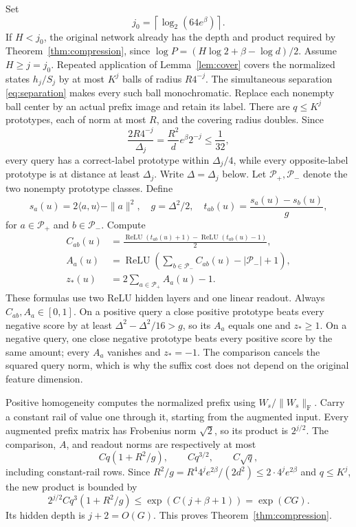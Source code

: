 \documentclass[11pt]{article}
\theoremstyle{remark}\newtheorem{remark}[theorem]{Remark}
\newcommand{\relu}{\operatorname{ReLU}}
\newcommand{\F}{\mathrm F}
\begin{document}
Set
\[
 j_0=\left\lceil\log_2(64e^\beta)\right\rceil.
\]
If $H<j_0$, the original network already has the depth and product required
by Theorem~\ref{thm:compression}, since
$\log P=(H\log2+\beta-\log d)/2$.  Assume $H\ge j=j_0$.
Repeated application of Lemma~\ref{lem:cover} covers the normalized states
$h_j/S_j$ by at most $K^j$ balls of radius $R4^{-j}$.
The simultaneous separation \eqref{eq:separation} makes every such ball
monochromatic. Replace each nonempty ball center by an actual prefix
image and retain its label. There are $q\le K^j$ prototypes, each of norm
at most $R$, and the covering radius doubles. Since
\[
 \frac{2R4^{-j}}{\Delta_j}
 =\frac{R^2}{d}e^\beta2^{-j}\le\frac1{32},
\]
every query has a correct-label prototype within $\Delta_j/4$, while every
opposite-label prototype is at distance at least $\Delta_j$. Write
$\Delta=\Delta_j$ below.
Let $\mathcal P_+,\mathcal P_-$ denote the two nonempty prototype classes.
Define
\[
 s_a(u)=2\langle a,u\rangle-\|a\|^2,\quad g=\Delta^2/2,
 \quad t_{ab}(u)=\frac{s_a(u)-s_b(u)}g,
\]
for $a\in\mathcal P_+$ and $b\in\mathcal P_-$.  Compute
\begin{align*}
 C_{ab}(u)&=\frac{\relu(t_{ab}(u)+1)-\relu(t_{ab}(u)-1)}2,\\
 A_a(u)&=\relu\left(\sum_{b\in\mathcal P_-}C_{ab}(u)
                                      -|\mathcal P_-|+1\right),\\
 z_*(u)&=2\sum_{a\in\mathcal P_+}A_a(u)-1.
\end{align*}
These formulas use two ReLU hidden layers and one linear readout.
Always $C_{ab},A_a\in[0,1]$.  On a positive query a close positive
prototype beats every negative score by at least
$\Delta^2-\Delta^2/16>g$, so its $A_a$ equals one and $z_*\ge1$.
On a negative query, one close negative prototype beats every positive
score by the same amount; every $A_a$ vanishes and $z_*=-1$.
The comparison cancels the squared query norm, which is why the suffix
cost does not depend on the original feature dimension.

Positive homogeneity computes the normalized prefix using
$W_s/\|W_s\|_\F$.  Carry a constant rail of value one through it, starting
from the augmented input.  Every augmented prefix matrix has Frobenius
norm $\sqrt2$, so its product is $2^{j/2}$.  The comparison, $A$, and
readout norms are respectively at most
\[
 Cq(1+R^2/g),\qquad Cq^{3/2},\qquad C\sqrt q,
\]
including constant-rail rows.  Since
$R^2/g=R^4 4^je^{2\beta}/(2d^2)\le2\cdot4^je^{2\beta}$ and
$q\le K^j$, the new product is bounded by
\[
 2^{j/2}Cq^3(1+R^2/g)\le\exp(C(j+\beta+1))=\exp(CG).
\]
Its hidden depth is $j+2=O(G)$.  This proves
Theorem~\ref{thm:compression}.
\end{document}
